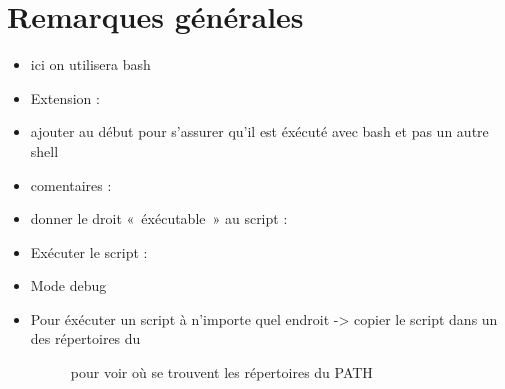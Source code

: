 \documentclass[letterpaper,10pt,french]{sphinxmanual}
\begin{document}
\section{Remarques générales}
\label{\detokenize{21-scripts-shell:remarques-generales}}\begin{itemize}
\item {} 
ici on utilisera bash

\item {} 
Extension : 

\item {} 
ajouter  au début pour s’assurer qu’il est éxécuté avec bash et pas un autre shell

\item {} 
comentaires : \sphinxcode{\sphinxupquote{\#}}

\item {} \begin{description}
\item[{donner le droit « éxécutable » au script :}] \leavevmode
{}

\end{description}

\item {} \begin{description}
\item[{Exécuter le script :}] \leavevmode
{}

\end{description}

\item {} \begin{description}
\item[{Mode debug}] \leavevmode{[}\sphinxcode{\sphinxupquote{bash -x}}{]}

\end{description}

\item {} \begin{description}
\item[{Pour éxécuter un script à n’importe quel endroit -\textgreater{} copier le script dans un des répertoires du }] \leavevmode
{} pour voir où se trouvent les répertoires du PATH

\end{description}

\end{itemize}
\end{document}
